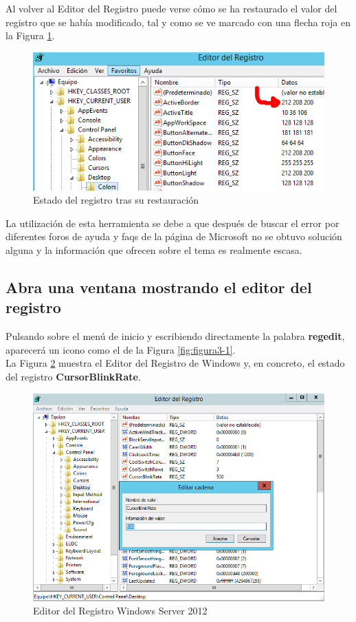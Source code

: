 	Al volver al Editor del Registro puede verse cómo se ha restaurado el valor del registro que se había modificado, tal y como se ve marcado con una flecha roja en la Figura \ref{fig:figura3-12}.
		\begin{figure}[H] %
			\centering
			\includegraphics[scale=0.9]{figuras/ejercicio3/figura3-12.png} 
			\caption{Estado del registro tras su restauración} 
			\label{fig:figura3-12}
		\end{figure} 
	\vspace{-5pt}
	La utilización de esta herramienta se debe a que después de buscar el error por diferentes foros de ayuda y faqs de la página de Microsoft no se obtuvo solución alguna y la información que ofrecen sobre el tema es realmente escasa.
\newpage

\subsection{Abra una ventana mostrando el editor del
	registro}
Pulsando sobre el menú de inicio y escribiendo directamente la palabra \textbf{regedit}, aparecerá un icono como el de la Figura \ref{fig:figura3-1}.
\\

La Figura \ref{fig:figura3-14} muestra el Editor del Registro de Windows y, en concreto, el estado del registro \textbf{CursorBlinkRate}.
		\begin{figure}[H] %
			\centering
			\includegraphics[scale=0.8]{figuras/ejercicio3/figura3-14.png} 
			\caption{Editor del Registro Windows Server 2012} 
			\label{fig:figura3-14}
		\end{figure}

